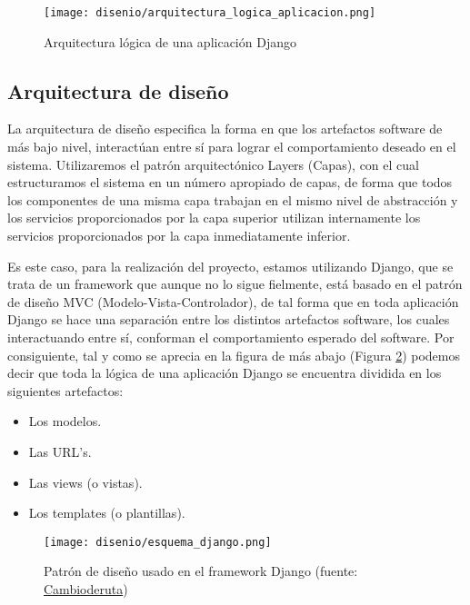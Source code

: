 \begin{figure}[H]
    \begin{center}
        \texttt{[image: disenio/arquitectura\_logica\_aplicacion.png]}
    \end{center}
    \caption{Arquitectura lógica de una aplicación Django}
    \label{fig:ArquitecturaLogicaAplicacion}
\end{figure}


\subsection{Arquitectura de diseño}
La arquitectura de diseño especifica la forma en que los artefactos software de
más bajo nivel, interactúan entre sí para lograr el comportamiento deseado en el
sistema. Utilizaremos el patrón arquitectónico  Layers (Capas), con el cual
estructuramos el sistema en un número apropiado de capas, de forma que todos los
componentes de una misma capa trabajan en el mismo nivel de abstracción y los
servicios proporcionados por la capa superior utilizan internamente los
servicios proporcionados por la capa inmediatamente inferior.

Es este caso, para la realización del proyecto, estamos utilizando Django, que
se trata de un framework que aunque no lo sigue fielmente, está basado en el
patrón de diseño MVC (Modelo-Vista-Controlador), de tal forma que en toda
aplicación Django se hace una separación entre los distintos artefactos software,
los cuales interactuando entre sí, conforman el comportamiento esperado del
software. Por consiguiente, tal y como se aprecia en la figura de más abajo
(Figura \ref{fig:DjangoPattern}) podemos decir que toda la lógica de una
aplicación Django se encuentra dividida en los siguientes artefactos:
\begin{itemize}
    \item Los modelos.
    \item Las URL's.
    \item Las views (o vistas).
    \item Los templates (o plantillas).
\end{itemize}

\begin{figure}[H]
    \begin{center}
        \texttt{[image: disenio/esquema\_django.png]}
    \end{center}
    \caption{Patrón de diseño usado en el framework Django (fuente:
              \href{http://cambioderuta.wordpress.com/2010/01/11/\%C2\%BFque-es-django/}{Cambioderuta})}
    \label{fig:DjangoPattern}
\end{figure}

